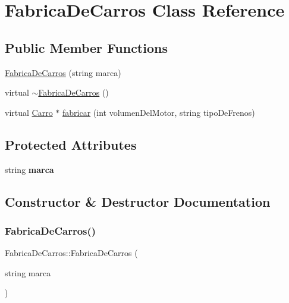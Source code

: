 \hypertarget{classFabricaDeCarros}{}\section{Fabrica\+De\+Carros Class Reference}
\label{classFabricaDeCarros}
\subsection*{Public Member Functions}
\begin{DoxyCompactItemize}
\item 
\hyperlink{classFabricaDeCarros_ab9c58994e426ec7850b3f558222883ac}{Fabrica\+De\+Carros} (string marca)
\item 
virtual \hyperlink{classFabricaDeCarros_ac43e6f8fe999b922e00ba594dac05634}{$\sim$\+Fabrica\+De\+Carros} ()
\item 
virtual \hyperlink{classCarro}{Carro} $\ast$ \hyperlink{classFabricaDeCarros_a5cab084613807ac5088a417a079fa0c5}{fabricar} (int volumen\+Del\+Motor, string tipo\+De\+Frenos)
\end{DoxyCompactItemize}
\subsection*{Protected Attributes}
\begin{DoxyCompactItemize}
\item 
\mbox{\label{classFabricaDeCarros_a7cd601a3ea501b25e687c74069e1d3b1}} 
string {\bfseries marca}
\end{DoxyCompactItemize}


\subsection{Constructor \& Destructor Documentation}
\mbox{\label{classFabricaDeCarros_ab9c58994e426ec7850b3f558222883ac}} 
\subsubsection{\texorpdfstring{Fabrica\+De\+Carros()}{FabricaDeCarros()}}
{\footnotesize\ttfamily Fabrica\+De\+Carros\+::\+Fabrica\+De\+Carros (\begin{DoxyParamCaption}\item[{string}]{marca }\end{DoxyParamCaption})}

